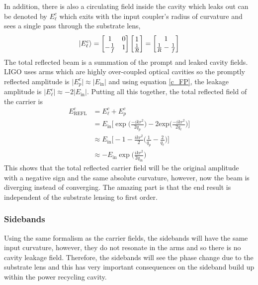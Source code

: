 		In addition, there is also a circulating field inside the cavity which leaks out can be denoted by $E^c_{\ell}$ which exits with the input coupler's radius of curvature and sees a single pass through the substrate lens,
		\begin{equation}\label{eq:leakE}
		\ket{E^c_{\ell}} = 		 
		\begin{bmatrix}
		1 	&	0 
		\\ 	-\frac{1}{f} 	&	1
		\end{bmatrix}
		\begin{bmatrix}
		1  
		\\ 	\frac{1}{R}
		\end{bmatrix}
		=
		\begin{bmatrix}
		1  
		\\ 	\frac{1}{R} - \frac{1}{f}
		\end{bmatrix}
		\end{equation}
		The total reflected beam is a summation of the prompt and leaked cavity fields.  LIGO uses arms which are highly over-coupled optical cavities so the promptly reflected amplitude is $\vert E^c_p \vert \approx \vert E_{\text{in}} \vert$ and using equation \ref{c_FP}, the leakage amplitude is $\vert E^c_\ell \vert \approx -2\vert E_{\text{in}} \vert$.  Putting all this together, the total reflected field of the carrier is
		\begin{equation}
		\begin{aligned}
		E^c_{\text{REFL}} 	&= E^c_{\ell} + E^c_p \\
							&= E_{\text{in}} \bigg[ \exp \bigg(\frac{-ik r^2}{2q_p}\bigg) - 2  \text{exp} \bigg(\frac{-ik r^2}{2q_{\ell}}\bigg) \bigg]\\
							&\approx E_{\text{in}} \bigg[ -1 - \frac{ikr^2}{2} \bigg( \frac{1}{q_p} - \frac{2}{q_\ell} \bigg) \bigg]\\
							&\approx -E_{\text{in}} \exp\bigg(\frac{ikr^2}{2q_{\text{in}}}\bigg) 
		\end{aligned} 
		\end{equation}
		This shows that the total reflected carrier field will be the original amplitude with a negative sign and the same absolute curvature, however, now the beam is diverging instead of converging.  The amazing part is that the end result is independent of the substrate lensing to first order.
		
		\subsubsection{Sidebands}
		Using the same formalism as the carrier fields, the sidebands will have the same input curvature, however, they do not resonate in the arms and so there is no cavity leakage field.  Therefore, the sidebands will see the phase change due to the substrate lens and this has very important consequences on the sideband build up within the power recycling cavity.
		
